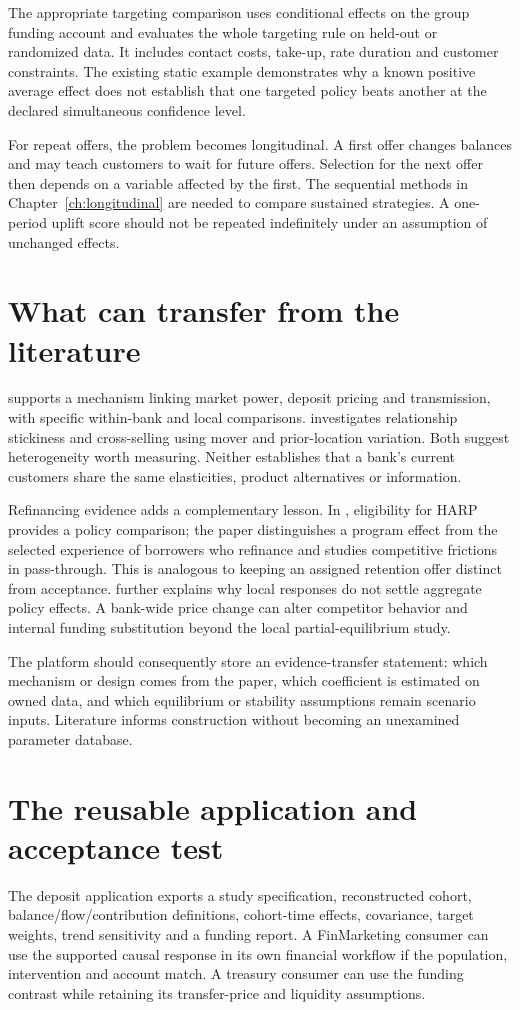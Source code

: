The appropriate targeting comparison uses conditional effects on the
group funding account and evaluates the whole targeting rule on held-out
or randomized data. It includes contact costs, take-up, rate duration and
customer constraints. The existing static example demonstrates why a
known positive average effect does not establish that one targeted policy
beats another at the declared simultaneous confidence level.

For repeat offers, the problem becomes longitudinal. A first offer changes
balances and may teach customers to wait for future offers. Selection for
the next offer then depends on a variable affected by the first.
The sequential methods in Chapter~\ref{ch:longitudinal} are needed to
compare sustained strategies. A one-period uplift score should not be
repeated indefinitely under an assumption of unchanged effects.

\section{What can transfer from the literature}
\citet{drechsler2017} supports a mechanism linking market power,
deposit pricing and transmission, with specific within-bank and local
comparisons. \citet{basten2026} investigates relationship stickiness and
cross-selling using mover and prior-location variation. Both suggest
heterogeneity worth measuring. Neither establishes that a bank's current
customers share the same elasticities, product alternatives or information.

Refinancing evidence adds a complementary lesson. In
\citet{agarwal2020}, eligibility for HARP provides a policy comparison;
the paper distinguishes a program effect from the selected experience
of borrowers who refinance and studies competitive frictions in pass-through.
This is analogous to keeping an assigned retention offer distinct from
acceptance. \citet{beraja2019} further explains why local responses do
not settle aggregate policy effects. A bank-wide price change can alter
competitor behavior and internal funding substitution beyond the local
partial-equilibrium study.

The platform should consequently store an evidence-transfer statement:
which mechanism or design comes from the paper, which coefficient is
estimated on owned data, and which equilibrium or stability assumptions
remain scenario inputs. Literature informs construction without becoming
an unexamined parameter database.

\section{The reusable application and acceptance test}
The deposit application exports a study specification, reconstructed cohort,
balance/flow/contribution definitions, cohort-time effects, covariance,
target weights, trend sensitivity and a funding report. A FinMarketing
consumer can use the supported causal response in its own financial
workflow if the population, intervention and account match. A treasury
consumer can use the funding contrast while retaining its transfer-price
and liquidity assumptions.

